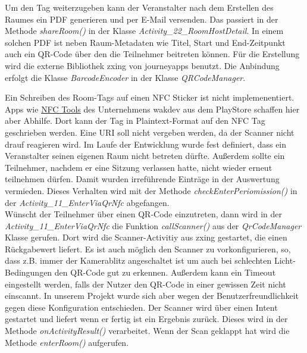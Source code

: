 Um den Tag weiterzugeben kann der Veranstalter nach dem Erstellen des Raumes ein PDF generieren und per E-Mail versenden. 
Das passiert in der Methode \textit{shareRoom()} in der Klasse \textit{Activity\_22\_RoomHostDetail}. 
In einem solchen PDF ist neben Raum-Metadaten wie Titel, Start und End-Zeitpunkt auch ein QR-Code über den die Teilnehmer beitreten können. 
Für die Erstellung wird die externe Bibliothek zxing von journeyapps benutzt. Die Anbindung erfolgt die Klasse \textit{BarcodeEncoder} in der Klasse \textit{QRCodeManager}.

Ein Schreiben des Room-Tags auf einen NFC Sticker ist nicht implemenentiert.
 Apps wie \href{https://play.google.com/store/apps/details?id=com.wakdev.wdnfc&hl=de&gl=US}{NFC Tools} des Unternehmens wakdev aus dem PlayStore schaffen hier aber Abhilfe. 
Dort kann der Tag in Plaintext-Format auf den NFC Tag geschrieben werden.
Eine URI soll nicht vergeben werden, da der Scanner nicht drauf reagieren wird.
Im Laufe der Entwicklung  wurde fest definiert, dass ein Veranstalter seinen eigenen Raum nicht betreten dürfte.
 Außerdem sollte ein Teilnehmer, nachdem er eine Sitzung verlassen hatte, nicht wieder erneut teilnehmen dürfen. 
 Damit wurden irreführende Einträge in der Auswertung vermieden. Dieses Verhalten wird mit der Methode \textit{checkEnterPeriomission()} in der \textit{Activity\_11\_EnterViaQrNfc} abgefangen.
\\ 
Wünscht der Teilnehmer über einen QR-Code einzutreten, dann wird in der \textit{Activity\_11\_EnterViaQrNfc} die Funktion \textit{callScanner()} aus der \textit{QrCodeManager} Klasse gerufen. 
Dort wird die Scanner-Activitiy aus zxing gestartet, die einen Rückgabewert liefert. 
Es ist auch möglich den Scanner zu vorkonfigurieren, so, dass z.B. immer der Kamerablitz angeschaltet ist um auch bei schlechten Licht-Bedingungen den QR-Code gut zu erkennen. 
Außerdem kann ein Timeout eingestellt werden, falls der Nutzer den QR-Code in einer gewissen Zeit nicht einscannt.
In unserem Projekt wurde sich aber wegen der Benutzerfreundlichkeit gegen diese Konfiguration entschieden.
Der Scanner wird über einen Intent gestartet und liefert wenn er fertig ist ein Ergebnis zurück.
Dieses wird in der Methode \textit{onActivityResult()} verarbeitet. Wenn der Scan geklappt hat wird die Methode \textit{enterRoom()} aufgerufen. 
